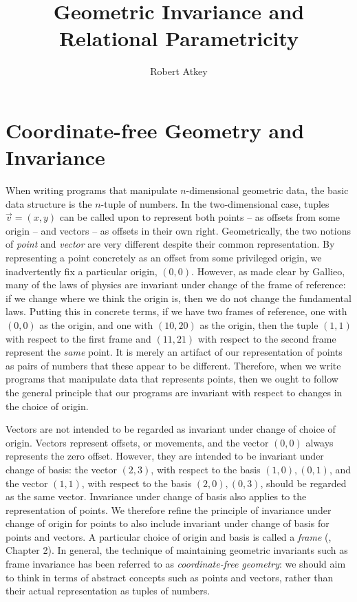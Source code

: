 \documentclass{article}
\title{Geometric Invariance and Relational Parametricity}
\author{Robert Atkey}
\begin{document}
\maketitle

\section{Coordinate-free Geometry and Invariance}

When writing programs that manipulate $n$-dimensional geometric data,
the basic data structure is the $n$-tuple of numbers. In the
two-dimensional case, tuples $\vec{v} = (x,y)$ can be called upon to
represent both points -- as offsets from some origin -- and vectors --
as offsets in their own right. Geometrically, the two notions of
\emph{point} and \emph{vector} are very different despite their common
representation. By representing a point concretely as an offset from
some privileged origin, we inadvertently fix a particular origin,
$(0,0)$. However, as made clear by Gallieo, many of the laws of
physics are invariant under change of the frame of reference: if we
change where we think the origin is, then we do not change the
fundamental laws. Putting this in concrete terms, if we have two
frames of reference, one with $(0,0)$ as the origin, and one with
$(10,20)$ as the origin, then the tuple $(1,1)$ with respect to the
first frame and $(11,21)$ with respect to the second frame represent
the \emph{same} point. It is merely an artifact of our representation
of points as pairs of numbers that these appear to be
different. Therefore, when we write programs that manipulate data that
represents points, then we ought to follow the general principle that
our programs are invariant with respect to changes in the choice of
origin.

Vectors are not intended to be regarded as invariant under change of
choice of origin. Vectors represent offsets, or movements, and the
vector $(0,0)$ always represents the zero offset. However, they are
intended to be invariant under change of basis: the vector $(2,3)$,
with respect to the basis $(1,0),(0,1)$, and the vector $(1,1)$, with
respect to the basis $(2,0),(0,3)$, should be regarded as the same
vector. Invariance under change of basis also applies to the
representation of points. We therefore refine the principle of
invariance under change of origin for points to also include invariant
under change of basis for points and vectors. A particular choice of
origin and basis is called a \emph{frame} (\cite{gallier11geometric},
Chapter 2). In general, the technique of maintaining geometric
invariants such as frame invariance has been referred to as
\emph{coordinate-free geometry}: we should aim to think in terms of
abstract concepts such as points and vectors, rather than their actual
representation as tuples of numbers.
\end{document}
